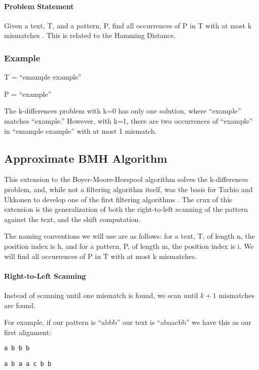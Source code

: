 \documentclass[10pt]{article}
\begin{document}
\paragraph*{Problem Statement}Given a text, T, and a pattern, P, find all occurrences of P
in T with at most k mismatches \cite{taruk93}. This is related to the Hamming Distance.

\subsubsection*{Example}

\noindent T = ``emample example''

\noindent P = ``example''

The k-differences problem with k=0 has only one solution, where ``example'' matches ``example.''
However, with k=1, there are two occurrences of ``example'' in ``emample example'' with at most 1 mismatch.

\subsection*{Approximate BMH Algorithm}

This extension to the Boyer-Moore-Horspool algorithm solves the k-differences problem, and, while not a
filtering algorithm itself, was the basis for Tarhio and Ukkonen to develop one of the first filtering algorithms
\cite{taruk93}. The crux of this extension is the generalization of both the right-to-left scanning of the pattern
against the text, and the shift computation.

The naming conventions we will use are as follows: for a text, T, of length n, the position index is h, and for a
pattern, P, of length m, the position index is i. We will find all occurrences of P in T with at most k mismatches.

\paragraph{Right-to-Left Scanning}
Instead of scanning until one mismatch is found, we scan until $k+1$ mismatches are found.

For example, if our pattern is ``abbb'' our text is ``abaacbb'' we have this as our first alignment:

\vspace{12pt}

\noindent \verb/a b b b/

\noindent \verb/a b a a c b b/
\end{document}
